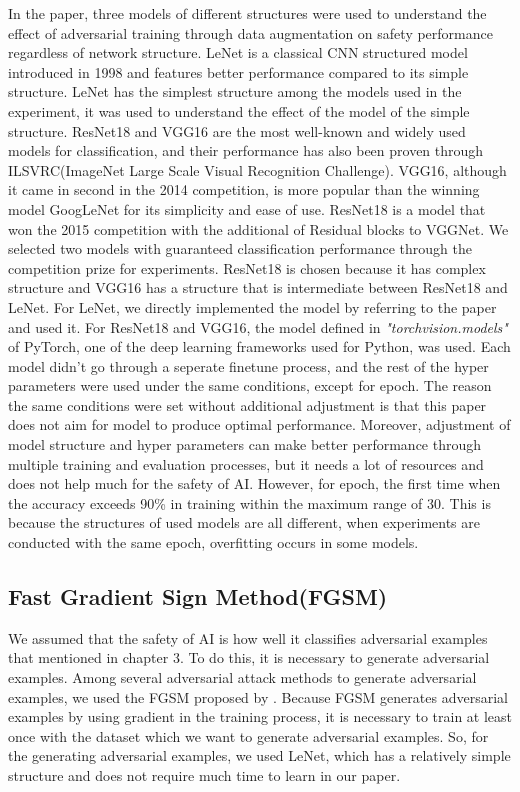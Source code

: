 \documentclass[journal,article,submit,moreauthors,pdftex]{Definitions/mdpi}
\begin{document}
In the paper, three models of different structures were used to understand the effect of adversarial training through data augmentation on safety performance regardless of network structure.
LeNet\cite{lenet} is a classical CNN  structured model introduced in 1998 and features better performance compared to its simple structure.
LeNet has the simplest structure among the models used in the experiment, it was used to understand the effect of the model of the simple structure.
ResNet18\cite{resnet} and VGG16\cite{vgg} are the most well-known and widely used models for classification, and their performance has also been proven through ILSVRC(ImageNet Large Scale Visual Recognition Challenge).
VGG16, although it came in second in the 2014 competition, is more popular than the winning model GoogLeNet for its simplicity and ease of use.
ResNet18 is a model that won the 2015 competition with the additional of Residual blocks to VGGNet.
We selected two models with guaranteed classification performance through the competition prize for experiments.
ResNet18 is chosen because it has complex structure and VGG16 has a structure that is intermediate between ResNet18 and LeNet.
For LeNet, we directly implemented the model by referring to the paper and used it.
For ResNet18 and VGG16, the model defined in {\it "torchvision.models"} of PyTorch\cite{pytorch}, one of the deep learning frameworks used for Python, was used.
Each model didn't go through a seperate finetune process, and the rest of the hyper parameters were used under the same conditions, except for epoch.
The reason the same conditions were set without additional adjustment is that this paper does not aim for model to produce optimal performance.
Moreover, adjustment of model structure and hyper parameters can make better performance through multiple training and evaluation processes, but it needs a lot of resources and does not help much for the safety of AI.
However, for epoch, the first time when the accuracy exceeds 90\% in training within the maximum range of 30. This is because the structures of used models are all different, when experiments are conducted with the same epoch, overfitting occurs in some models.

\subsection{Fast Gradient Sign Method(FGSM)}

We assumed that the safety of AI is how well it classifies adversarial examples that mentioned in chapter 3.
To do this, it is necessary to generate adversarial examples. Among several adversarial attack methods to generate adversarial examples, we used the FGSM proposed by \cite{adversarial-goodfellow}.
Because FGSM generates adversarial examples by using gradient in the training process, it is necessary to train at least once with the dataset which we want to generate adversarial examples.
So, for the generating adversarial examples, we used LeNet, which has a relatively simple structure and does not require much time to learn in our paper.
\end{document}
